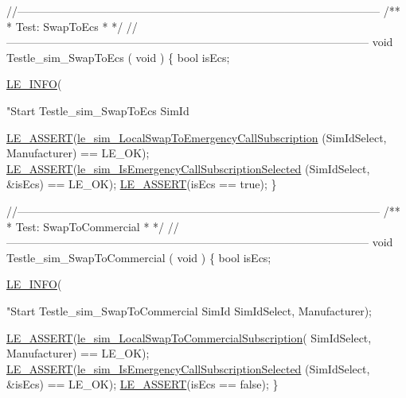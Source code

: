 \begin{DoxyCodeInclude}
{{{{{{{{{{{{\textcolor{comment}{//--------------------------------------------------------------------------------------------------}\textcolor{comment}{}
\textcolor{comment}{/**}
\textcolor{comment}{ * Test: SwapToEcs}
\textcolor{comment}{ *}
\textcolor{comment}{ */}
\textcolor{comment}{//--------------------------------------------------------------------------------------------------}
\textcolor{keywordtype}{void} Testle\_sim\_SwapToEcs
(
    \textcolor{keywordtype}{void}
)
\{
    \textcolor{keywordtype}{bool} isEcs;

    \hyperlink{le__log_8h_a23e6d206faa64f612045d688cdde5808}{LE\_INFO}(\textcolor{stringliteral}{"Start Testle\_sim\_SwapToEcs SimId %

    \hyperlink{le__log_8h_ac0dbbef91dc0fed449d0092ff0557b39}{LE\_ASSERT}(\hyperlink{le__sim__interface_8h_aa856f5e094e8182c8d0b07761e309549}{le\_sim\_LocalSwapToEmergencyCallSubscription}
      (SimIdSelect, Manufacturer) == LE\_OK);
    \hyperlink{le__log_8h_ac0dbbef91dc0fed449d0092ff0557b39}{LE\_ASSERT}(\hyperlink{le__sim__interface_8h_a837cdc0fe30761f4339f846a0b44c5f1}{le\_sim\_IsEmergencyCallSubscriptionSelected}
      (SimIdSelect, &isEcs) == LE\_OK);
    \hyperlink{le__log_8h_ac0dbbef91dc0fed449d0092ff0557b39}{LE\_ASSERT}(isEcs == \textcolor{keyword}{true});
\}

\textcolor{comment}{//--------------------------------------------------------------------------------------------------}\textcolor{comment}{}
\textcolor{comment}{/**}
\textcolor{comment}{ * Test: SwapToCommercial}
\textcolor{comment}{ *}
\textcolor{comment}{ */}
\textcolor{comment}{//--------------------------------------------------------------------------------------------------}
\textcolor{keywordtype}{void} Testle\_sim\_SwapToCommercial
(
    \textcolor{keywordtype}{void}
)
\{
    \textcolor{keywordtype}{bool} isEcs;

    \hyperlink{le__log_8h_a23e6d206faa64f612045d688cdde5808}{LE\_INFO}(\textcolor{stringliteral}{"Start Testle\_sim\_SwapToCommercial SimId %
        SimIdSelect, Manufacturer);

    \hyperlink{le__log_8h_ac0dbbef91dc0fed449d0092ff0557b39}{LE\_ASSERT}(\hyperlink{le__sim__interface_8h_a51b535750b66c4cf460e3c8c72f3658d}{le\_sim\_LocalSwapToCommercialSubscription}(
      SimIdSelect, Manufacturer) == LE\_OK);
    \hyperlink{le__log_8h_ac0dbbef91dc0fed449d0092ff0557b39}{LE\_ASSERT}(\hyperlink{le__sim__interface_8h_a837cdc0fe30761f4339f846a0b44c5f1}{le\_sim\_IsEmergencyCallSubscriptionSelected}
      (SimIdSelect, &isEcs) == LE\_OK);
    \hyperlink{le__log_8h_ac0dbbef91dc0fed449d0092ff0557b39}{LE\_ASSERT}(isEcs == \textcolor{keyword}{false});
\}

}}}}}}}}}}}}}}
\end{DoxyCodeInclude}
